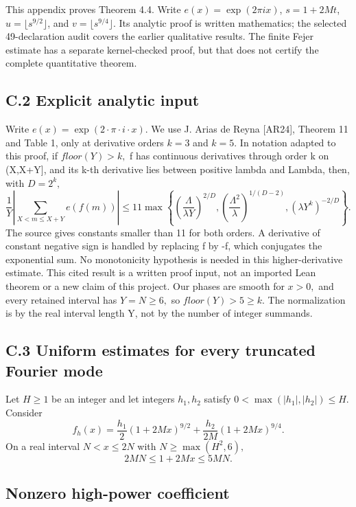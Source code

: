 \documentclass[11pt,a4paper]{article}
\begin{document}
This appendix proves Theorem 4.4. Write \(e(x)=\exp(2\pi i x)\),
\(s=1+2Mt\), \(u=\lfloor s^{9/2}\rfloor\), and
\(v=\lfloor s^{9/4}\rfloor\). Its analytic proof is written mathematics;
the selected 49-declaration audit covers the earlier qualitative
results. The finite Fejer estimate has a separate kernel-checked proof,
but that does not certify the complete quantitative theorem.

\subsection{C.2 Explicit analytic
input}\label{c.2-explicit-analytic-input}

Write \(e(x)=\exp(2\cdot \pi\cdot i\cdot x).\) We use J. Arias de Reyna
{[}AR24{]}, Theorem 11 and Table 1, only at derivative orders \(k=3\)
and \(k=5.\) In notation adapted to this proof, if \(floor(Y)>k,\) f has
continuous derivatives through order k on (X,X+Y{]}, and its k-th
derivative lies between positive lambda and Lambda, then, with
\(D=2^k,\) \[
\frac1Y\left|\sum_{X<m\le X+Y}e(f(m))\right|
\le 11\max\left\{
 \left(\frac{\Lambda}{\lambda Y}\right)^{2/D},
 \left(\frac{\Lambda^2}{\lambda}\right)^{1/(D-2)},
 (\lambda Y^k)^{-2/D}\right\}. \tag{C.5}
\] The source gives constants smaller than 11 for both orders. A
derivative of constant negative sign is handled by replacing f by -f,
which conjugates the exponential sum. No monotonicity hypothesis is
needed in this higher-derivative estimate. This cited result is a
written proof input, not an imported Lean theorem or a new claim of this
project. Our phases are smooth for \(x>0,\) and every retained interval
has \(Y=N\ge 6,\) so \(floor(Y)>5\ge k.\) The normalization is by the
real interval length Y, not by the number of integer summands.

\subsection{C.3 Uniform estimates for every truncated Fourier
mode}\label{c.3-uniform-estimates-for-every-truncated-fourier-mode}

Let \(H\ge 1\) be an integer and let integers \(h_1,h_2\) satisfy
\(0<\max(|h_1|,|h_2|)\le H.\) Consider \[
f_h(x)=\frac{h_1}{2}(1+2Mx)^{9/2}
       +\frac{h_2}{2M}(1+2Mx)^{9/4}. \tag{C.6}
\] On a real interval \(N<x\le 2N\) with \(N\ge \max(H^2,6),\) \[
2MN\le1+2Mx\le5MN. \tag{C.7}
\]

\subsection{Nonzero high-power
coefficient}\label{nonzero-high-power-coefficient}
\end{document}
